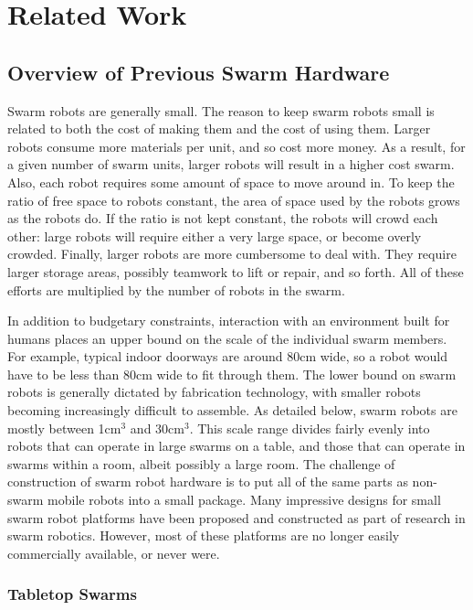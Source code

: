 \chapter{Related Work}
\thispagestyle{fancy}

\section{Overview of Previous Swarm Hardware} \label{section:Overview_of_Previous_Swarm_Hardware}

Swarm robots are generally small. 
The reason to keep swarm robots small is related to both the cost of making them and the cost of using them. 
Larger robots consume more materials per unit, and so cost more money.
As a result, for a given number of swarm units, larger robots will result in a higher cost swarm. 
Also, each robot requires some amount of space to move around in. 
To keep the ratio of free space to robots constant, the area of space used by the robots grows as the robots do. 
If the ratio is not kept constant, the robots will crowd each other: large robots will require either a very large space, or become overly crowded.
Finally, larger robots are more cumbersome to deal with. 
They require larger storage areas, possibly teamwork to lift or repair, and so forth. 
All of these efforts are multiplied by the number of robots in the swarm. 
 
In addition to budgetary constraints, interaction with an environment built for humans places an upper bound on the scale of the individual swarm members. 
For example, typical indoor doorways are around 80cm wide, so a robot would have to be less than 80cm wide to fit through them. 
The lower bound on swarm robots is generally dictated by fabrication technology, with smaller robots becoming increasingly difficult to assemble. 
As detailed below, swarm robots are mostly between 1cm$^3$ and 30cm$^3$. 
This scale range divides fairly evenly into robots that can operate in large swarms on a table, and those that can operate in swarms within a room, albeit possibly a large room. 
The challenge of construction of swarm robot hardware is to put all of the same parts as non-swarm mobile robots into a small package.
Many impressive designs for small swarm robot platforms have been proposed and constructed as part of research in swarm robotics. 
However, most of these platforms are no longer easily commercially available, or never were. 

\subsection{Tabletop Swarms} \label{section:Tabletop_Swarms}

